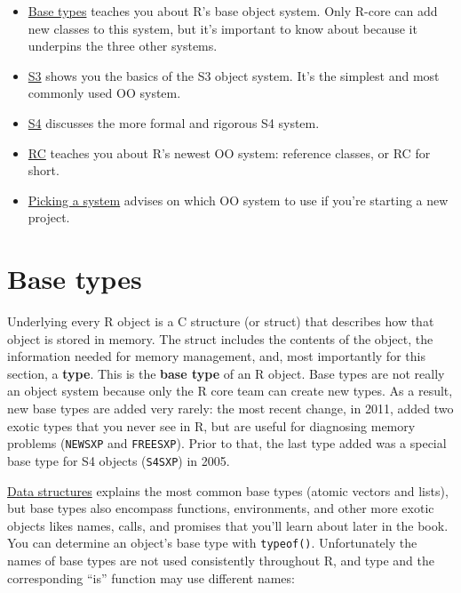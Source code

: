 \begin{itemize}
\item
  \protect\hyperlink{base-types}{Base types} teaches you about R's base
  object system. Only R-core can add new classes to this system, but
  it's important to know about because it underpins the three other
  systems.
\item
  \protect\hyperlink{s3}{S3} shows you the basics of the S3 object
  system. It's the simplest and most commonly used OO system.
\item
  \protect\hyperlink{s4}{S4} discusses the more formal and rigorous S4
  system.
\item
  \protect\hyperlink{rc}{RC} teaches you about R's newest OO system:
  reference classes, or RC for short.
\item
  \protect\hyperlink{picking-a-system}{Picking a system} advises on
  which OO system to use if you're starting a new project.
\end{itemize}

\hypertarget{base-types}{%
\section{Base types}\label{base-types}}

Underlying every R object is a C structure (or struct) that describes
how that object is stored in memory. The struct includes the contents of
the object, the information needed for memory management, and, most
importantly for this section, a \textbf{type}. This is the \textbf{base
type} of an R object. Base types are not really an object system because
only the R core team can create new types. As a result, new base types
are added very rarely: the most recent change, in 2011, added two exotic
types that you never see in R, but are useful for diagnosing memory
problems (\texttt{NEWSXP} and \texttt{FREESXP}). Prior to that, the last
type added was a special base type for S4 objects (\texttt{S4SXP}) in
2005.   

\protect\hyperlink{data-structures}{Data structures} explains the most
common base types (atomic vectors and lists), but base types also
encompass functions, environments, and other more exotic objects likes
names, calls, and promises that you'll learn about later in the book.
You can determine an object's base type with \texttt{typeof()}.
Unfortunately the names of base types are not used consistently
throughout R, and type and the corresponding ``is'' function may use
different names: 

